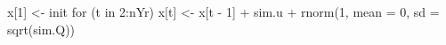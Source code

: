 \begin{Schunk}
\begin{Sinput}
 x[1] <- init
 for (t in 2:nYr) {
   x[t] <- x[t - 1] + sim.u + rnorm(1, mean = 0, sd = sqrt(sim.Q))
 }
\end{Sinput}
\end{Schunk}
